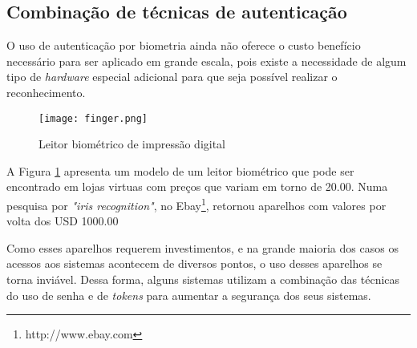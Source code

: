 \subsection{Combinação de técnicas de autenticação}
O uso de autenticação por biometria ainda não oferece o custo benefício necessário para ser aplicado em grande escala, pois existe a necessidade de algum tipo de \textit{hardware} especial adicional para que seja possível realizar o reconhecimento.

\begin{figure}[!htb]
	\centering
	\texttt{[image: finger.png]}
	\small
	\caption[Leitor biométrico de impressão digital]{Leitor biométrico de impressão digital}
	\label{fig:finger}
\end{figure}

A Figura \ref{fig:finger} apresenta um modelo de um leitor biométrico que pode ser encontrado em lojas virtuas com preços que variam em torno de 20.00. Numa pesquisa por \textit{"iris recognition"}, no Ebay\footnote{http://www.ebay.com}, retornou aparelhos com valores por volta dos USD 1000.00

Como esses aparelhos requerem investimentos, e na grande maioria dos casos os acessos aos sistemas acontecem de diversos pontos, o uso desses aparelhos se torna inviável.
Dessa forma, alguns sistemas utilizam a combinação das técnicas do uso de senha e de \textit{tokens} para aumentar a segurança dos seus sistemas.